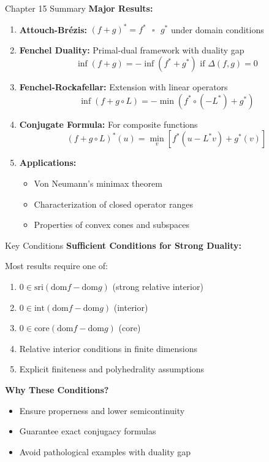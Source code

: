 \documentclass[aspectratio=169,10pt]{beamer}
\begin{document}
\begin{frame}{Chapter 15 Summary}
  \textbf{Major Results:}
  
  \begin{enumerate}
    \item \textbf{Attouch-Brézis:} $(f+g)^* = f^* \text{ } \square \text{ } g^*$ under domain conditions
    
    \item \textbf{Fenchel Duality:} Primal-dual framework with duality gap
      \[
        \inf(f+g) = -\inf(f^*+g^*) \text{ if } \Delta(f,g)=0
      \]
    
    \item \textbf{Fenchel-Rockafellar:} Extension with linear operators
      \[
        \inf(f + g \circ L) = -\min(f^* \circ (-L^*) + g^*) 
      \]
    
    \item \textbf{Conjugate Formula:} For composite functions
      \[
        (f + g \circ L)^*(u) = \min_v [f^*(u - L^*v) + g^*(v)]
      \]
    
    \item \textbf{Applications:}
      \begin{itemize}
        \item Von Neumann's minimax theorem
        \item Characterization of closed operator ranges
        \item Properties of convex cones and subspaces
      \end{itemize}
  \end{enumerate}
\end{frame}

\begin{frame}{Key Conditions}
  \textbf{Sufficient Conditions for Strong Duality:}
  
  \vspace{0.3cm}
  
  Most results require one of:
  \begin{enumerate}
    \item $0 \in \text{sri}(\text{dom} f - \text{dom} g)$ \quad (strong relative interior)
    \item $0 \in \text{int}(\text{dom} f - \text{dom} g)$ \quad (interior)
    \item $0 \in \text{core}(\text{dom} f - \text{dom} g)$ \quad (core)
    \item Relative interior conditions in finite dimensions
    \item Explicit finiteness and polyhedrality assumptions
  \end{enumerate}
  
  \vspace{0.3cm}
  
  \textbf{Why These Conditions?}
  \begin{itemize}
    \item Ensure properness and lower semicontinuity
    \item Guarantee exact conjugacy formulas
    \item Avoid pathological examples with duality gap
  \end{itemize}
\end{frame}
\end{document}
